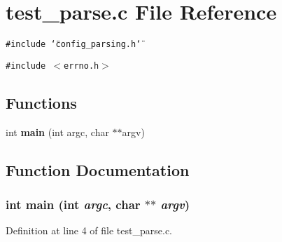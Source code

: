 \section{test\_\-parse.c File Reference}
\label{test__parse_8c}
{\tt \#include \char`\"{}config\_\-parsing.h\char`\"{}}\par
{\tt \#include $<$errno.h$>$}\par
\subsection*{Functions}
\begin{CompactItemize}
\item 
int {\bf main} (int argc, char $\ast$$\ast$argv)
\end{CompactItemize}


\subsection{Function Documentation}
\subsubsection[{main}]{\setlength{\rightskip}{0pt plus 5cm}int main (int {\em argc}, \/  char $\ast$$\ast$ {\em argv})}\label{test__parse_8c_3c04138a5bfe5d72780bb7e82a18e627}




Definition at line 4 of file test\_\-parse.c.